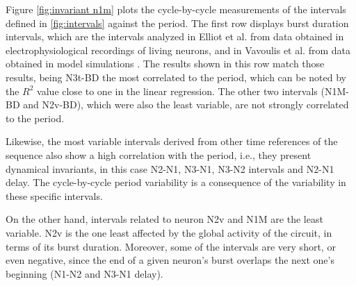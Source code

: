 Figure \ref{fig:invariant n1m} plots the cycle-by-cycle measurements of the intervals defined in \ref{fig:intervals} against the period. The first row displays burst duration intervals, which are the intervals analyzed in Elliot et al. \parencite{elliott_temporal_1991} from data obtained in electrophysiological recordings of living neurons, and in Vavoulis et al. from data obtained in model simulations \parencite{vavoulis_computational_2007}. The results shown in this row match those results, being N3t-BD the most correlated to the period, which can be noted by the $R^2$ value close to one in the linear regression. The other two intervals (N1M-BD and N2v-BD), which were also the least variable, are not strongly correlated to the period. 



Likewise, the most variable intervals derived from other time references of the sequence also show a high correlation with the period, i.e., they present dynamical invariants, in this case N2-N1, N3-N1, N3-N2 intervals and N2-N1 delay. The cycle-by-cycle period variability is a consequence of the variability in these specific intervals.

On the other hand, intervals related to neuron N2v and N1M are the least variable. N2v is the one least affected by the global activity of the circuit, in terms of its burst duration. Moreover, some of the intervals are very short, or even negative, since the end of a given neuron's burst overlaps the next one's beginning (N1-N2 and N3-N1 delay). %



